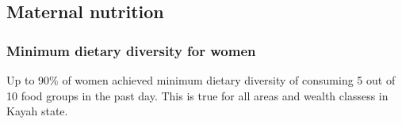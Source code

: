 \documentclass[12pt,a4paper]{article}
\begin{document}
\newpage

\hypertarget{maternal-nutrition}{%
\subsection{Maternal nutrition}\label{maternal-nutrition}}

\hypertarget{minimum-dietary-diversity-for-women}{%
\subsubsection{Minimum dietary diversity for women}\label{minimum-dietary-diversity-for-women}}

Up to 90\% of women achieved minimum dietary diversity of consuming 5 out of 10 food groups in the past day. This is true for all areas and wealth classess in Kayah state.
\end{document}
